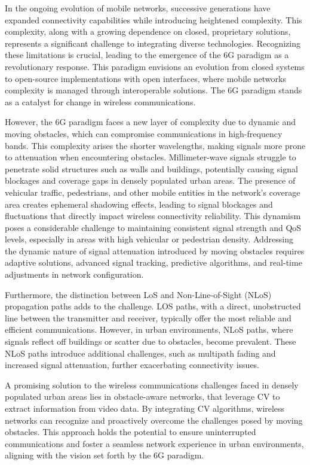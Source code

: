 In the ongoing evolution of mobile networks, successive generations have expanded connectivity capabilities while introducing heightened complexity.
This complexity, along with a growing dependence on closed, proprietary solutions, represents a significant challenge to integrating diverse technologies.
Recognizing these limitations is crucial, leading to the emergence of the 6G paradigm as a revolutionary response.
This paradigm envisions an evolution from closed systems to open-source implementations with open interfaces, where mobile networks complexity is managed through interoperable solutions.
The 6G paradigm stands as a catalyst for change in wireless communications.

However, the 6G paradigm faces a new layer of complexity due to dynamic and moving obstacles,  which can compromise communications in high-frequency bands.
This complexity arises the shorter wavelengths, making signals more prone to attenuation when encountering obstacles.
Millimeter-wave signals struggle to penetrate solid structures such as walls and buildings, potentially causing signal blockages and coverage gaps in densely populated urban areas.
The presence of vehicular traffic, pedestrians, and other mobile entities in the network's coverage area creates ephemeral shadowing effects, leading to signal blockages and fluctuations that directly impact wireless connectivity reliability.
This dynamism poses a considerable challenge to maintaining consistent signal strength and QoS levels, especially in areas with high vehicular or pedestrian density.
Addressing the dynamic nature of signal attenuation introduced by moving obstacles requires adaptive solutions, advanced signal tracking, predictive algorithms, and real-time adjustments in network configuration.

Furthermore, the distinction between LoS and Non-Line-of-Sight (NLoS) propagation paths adds to the challenge.
LOS paths, with a direct, unobstructed line between the transmitter and receiver, typically offer the most reliable and efficient communications.
However, in urban environments, NLoS paths, where signals reflect off buildings or scatter due to obstacles, become prevalent.
These NLoS paths introduce additional challenges, such as multipath fading and increased signal attenuation, further exacerbating connectivity issues.

A promising solution to the wireless communications challenges faced in densely populated urban areas lies in obstacle-aware networks, that leverage CV to extract information from video data.
By integrating CV algorithms, wireless networks can recognize and proactively overcome the challenges posed by moving obstacles.
This approach holds the potential to ensure uninterrupted communications and foster a seamless network experience in urban environments, aligning with the vision set forth by the 6G paradigm.

